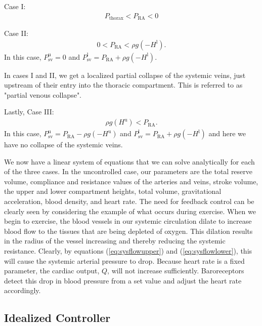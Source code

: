 \documentclass[12pt]{article}
\begin{document}
Case I:
\begin{align}
    P_\text{thorax}<P_\text{RA}<0
\end{align}



Case II: 
\begin{align}
    0 < P_\text{RA} < \rho g (-H^\text{l}).
\end{align}
In this case, $P^\text{u}_\text{sv}=0$ and $P^\text{l}_\text{sv}= P_\text{RA} + \rho g (-H^\text{l})$.

In cases I and II, we get a localized partial collapse of the systemic veins, just upstream of their entry into the thoracic compartment. This is referred to as "partial venous collapse". 

Lastly, Case III: 
\begin{align}
   \rho g (H^\text{u})<   P_\text{RA}.
\end{align}
In this case, $P^\text{u}_\text{sv}= P_\text{RA} - \rho g (-H^\text{u})$ and $P^\text{l}_\text{sv}= P_\text{RA} + \rho g (-H^\text{l})$ and here we have no collapse of the systemic veins. 

We now have a linear system of equations that we can solve analytically for each of the three cases. In the uncontrolled case, our parameters are the total reserve volume, compliance and resistance values of the arteries and veins, stroke volume, the upper and lower compartment heights, total volume, gravitational acceleration, blood density, and heart rate. The need for feedback control can be clearly seen by considering the example of what occurs during exercise. When we begin to exercise, the blood vessels in our systemic circulation dilate to increase blood flow to the tissues that are being depleted of oxygen. This dilation results in the radius of the vessel increasing and thereby reducing the systemic resistance. Clearly, by equations (\ref{eq:sysflowupper}) and (\ref{eq:sysflowlower}), this will cause the systemic arterial pressure to drop. Because heart rate is a fixed parameter, the cardiac output, $Q$, will not increase sufficiently. Baroreceptors detect this drop in blood pressure from a set value and adjust the heart rate accordingly. 

\subsection{Idealized Controller}
\end{document}
